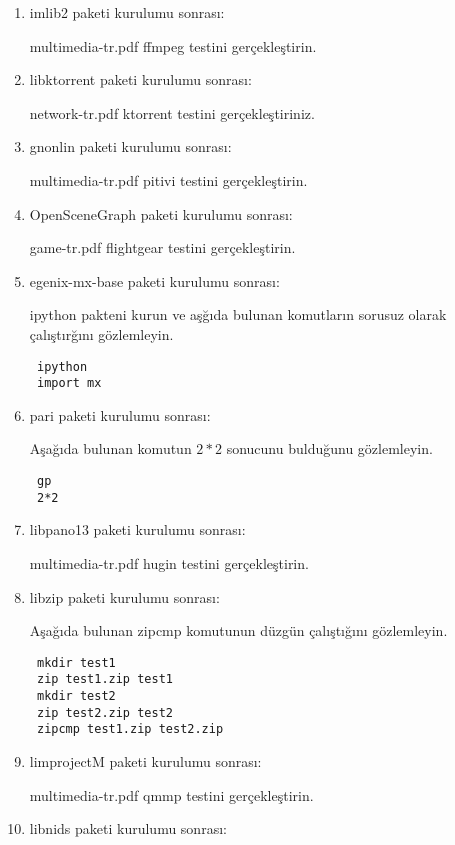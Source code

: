 \documentclass[a4paper,10pt]{article}
\begin{document}
\begin{enumerate}
\item imlib2 paketi kurulumu sonrası:

multimedia-tr.pdf ffmpeg testini gerçekleştirin.

\item libktorrent paketi kurulumu sonrası:

network-tr.pdf ktorrent testini gerçekleştiriniz.

\item gnonlin paketi kurulumu sonrası:

multimedia-tr.pdf pitivi testini gerçekleştirin.

\item OpenSceneGraph paketi kurulumu sonrası:

game-tr.pdf flightgear testini gerçekleştirin.

\item egenix-mx-base paketi kurulumu sonrası:

ipython pakteni kurun ve aşğıda bulunan komutların sorusuz olarak çalıştırğını gözlemleyin.

\begin{verbatim}
 ipython
 import mx
\end{verbatim}


\item pari paketi kurulumu sonrası:

Aşağıda bulunan komutun $2*2$ sonucunu bulduğunu gözlemleyin.
\begin{verbatim}
 gp 
 2*2
\end{verbatim}

\item libpano13 paketi kurulumu sonrası:
  
multimedia-tr.pdf hugin testini gerçekleştirin.

\item libzip paketi kurulumu sonrası:

Aşağıda bulunan zipcmp komutunun düzgün çalıştığını gözlemleyin.
\begin{verbatim}
 mkdir test1
 zip test1.zip test1
 mkdir test2
 zip test2.zip test2
 zipcmp test1.zip test2.zip
\end{verbatim}

\item limprojectM paketi kurulumu sonrası:
  
multimedia-tr.pdf qmmp testini gerçekleştirin.

\item libnids paketi kurulumu sonrası:


\end{enumerate}
\end{document}
